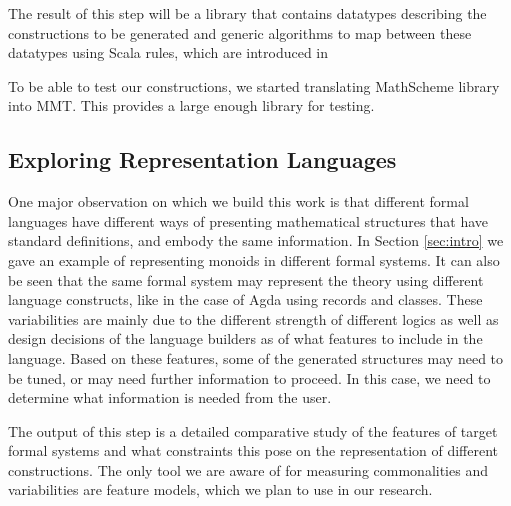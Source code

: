 The result of this step will be a library that contains datatypes describing the constructions to be 
generated and generic algorithms to map between these datatypes using Scala rules, which are 
introduced in \cite{rabe2017recon}


To be able to test our constructions, we started translating MathScheme library into MMT. This 
provides a large enough library for testing. 

\subsection{Exploring Representation Languages}
\label{sec:featuremodel}
One major observation on which we build this work is that different formal languages have different 
ways of presenting mathematical structures that have standard definitions, and embody the same 
information. In Section \ref{sec:intro} we gave an example of representing monoids in different 
formal systems. It can also be seen that the same formal system may represent the theory using 
different language constructs, like in the case of Agda using records and classes. These 
variabilities are mainly due to the different strength of different logics as well as design decisions of 
the language builders as of what features to include in the language. Based on these features, 
some 
of the generated structures may need to be tuned, or may need further information to proceed. In 
this case, we need to determine what information is needed from the user. 

The output of this step is a detailed comparative study of the features of target formal systems 
and 
what constraints this pose on the representation of different constructions. The only tool we are 
aware of for measuring commonalities and variabilities are feature models, which we plan to use in 
our research. 

